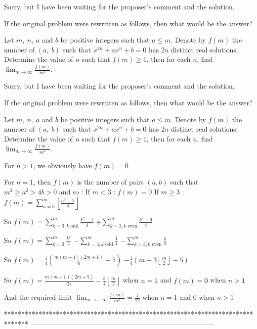 \begin{solution}
	Sorry, but I have been waiting for the proposer's comment and the solution.

If the original problem were rewritten as follows, then what would be the answer?

Let $m,\ n,\ a$ and $b$ be positive integers such that $a\leq m$.
Denote by $f(m)$ the number of $(a,\ b)$ such that $x^{2n}+ax^{n}+b=0$ has $2n$ distinct real solutions.
Determine the value of $n$ such that $f(m)\geq 1$, then for each $n$, find $\lim_{m\to\infty} \frac{f(m)}{m^3}.$
\end{solution}



\begin{solution}
	\begin{tcolorbox}Sorry, but I have been waiting for the proposer's comment and the solution.

If the original problem were rewritten as follows, then what would be the answer?

Let $m,\ n,\ a$ and $b$ be positive integers such that $a\leq m$.
Denote by $f(m)$ the number of $(a,\ b)$ such that $x^{2n}+ax^{n}+b=0$ has $2n$ distinct real solutions.
Determine the value of $n$ such that $f(m)\geq 1$, then for each $n$, find $\lim_{m\to\infty} \frac{f(m)}{m^3}.$\end{tcolorbox}
For $n>1$, we obviously have $f(m)=0$

For $n=1$, then $f(m)$ is the number of pairs $(a,b)$ such that $m^2\ge a^2>4b>0$ and so :
If $m<3$ : $f(m)=0$
If $m\ge 3$ : $f(m)=\sum_{a=3}^{m}\left\lfloor\frac{a^2-1}4\right\rfloor$

So $f(m)=\sum_{k=3,k\text{ odd}}^m\frac{k^2-1}4$ $+\sum_{k=3,k\text{ even}}^m\frac{k^2-4}4$

So $f(m)=\sum_{k=3}^m\frac{k^2}4$ $-\sum_{k=3,k\text{ odd}}^m\frac{1}4$ $-\sum_{k=3,k\text{ even}}^m\frac{4}4$

So $f(m)=\frac 14\left(\frac{m(m+1)(2m+1)}6-5\right)$ $-\frac 14\left(m+3\left\lfloor\frac m2\right\rfloor-5\right)$

So $\boxed{f(m)=\frac{m(m-1)(2m+5)}{24}-\frac 34\left\lfloor\frac m2\right\rfloor}$ when $n=1$ and $f(m)=0$ when $n>1$

And the required limit $\boxed{\lim_{m\to+\infty}\frac{f(m)}{m^3}=\frac 1{12}}$ when $n=1$ and $0$ when $n>1$
\end{solution}
*******************************************************************************
-------------------------------------------------------------------------------

